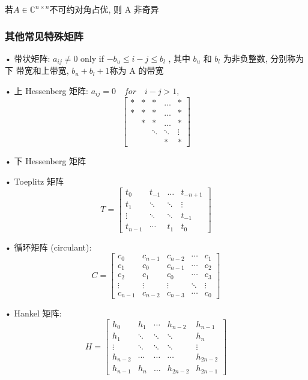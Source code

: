 \documentclass[12pt,a4paper]{article}
\begin{document}
\begin{framed}
	\begin{theorem}
		若$A \in \mathbb{C}^{n \times n}$不可约对角占优, 则 A 非奇异	
	\end{theorem}
\end{framed}

\subsubsection{其他常见特殊矩阵}
• 带状矩阵:
$a_{i j} \neq 0$ only if $-b_{u} \leq i-j \leq b_{l}$
, 其中 $b_u$ 和 $b_l$ 为非负整数, 分别称为下
带宽和上带宽, $b_u + b_l + 1 $称为 A 的带宽

• 上 Hessenberg 矩阵: $a_{ij} = 0\quad for\quad i − j > 1$,
$$
\left[\begin{array}{ccccc}{*} & {*} & {*} & {\dots} & {*} \\ {*} & {*} & {*} & {\dots} & {*} \\ { } & {*} & {*} & {\dots} & {*} \\ { } & { } & {\ddots} & {\ddots} & {\vdots}\\ { } & { } & { } & {*} & {*}\end{array}\right]
$$

• 下 Hessenberg 矩阵

• Toeplitz 矩阵
$$
T=\left[\begin{array}{cccc}{t_{0}} & {t_{-1}} & {\dots} & {t_{-n+1}} \\ {t_{1}} & {\ddots} & {\ddots} & {\vdots} \\ {\vdots} & {\ddots} & {\ddots} & {t_{-1}} \\ {t_{n-1}} & {\cdots} & {t_{1}} & {t_{0}}\end{array}\right]
$$

• 循环矩阵 (circulant):
$$
C=\left[\begin{array}{ccccc}{c_{0}} & {c_{n-1}} & {c_{n-2}} & {\cdots} & {c_{1}} \\ {c_{1}} & {c_{0}} & {c_{n-1}} & {\cdots} & {c_{2}} \\ {c_{2}} & {c_{1}} & {c_{0}} & {\cdots} & {c_{3}} \\ {\vdots} & {\vdots} & {\vdots} & {\ddots} & {\vdots} \\ {c_{n-1}} & {c_{n-2}} & {c_{n-3}} & {\cdots} & {c_{0}}\end{array}\right]
$$

• Hankel 矩阵:
$$
H=\left[\begin{array}{ccccc}{h_0} & {h_1} & {\cdots} & {h_{n-2}} & {h_{n-1}} \\ {h_1} & {\ddots} & {\ddots} & {\ddots} & {h_n}\\ {\vdots} & {\ddots} & {\ddots} & {\ddots} & {\vdots}  \\ {h_{n-2}} & {\cdots} & {\cdots} & {\cdots} & {h_{2n-2}} \\ {h_{n-1}} & {h_n} & {\dots} & {h_{2n-2}} & {h_{2n-1}}\end{array}\right]
$$
\end{document}
